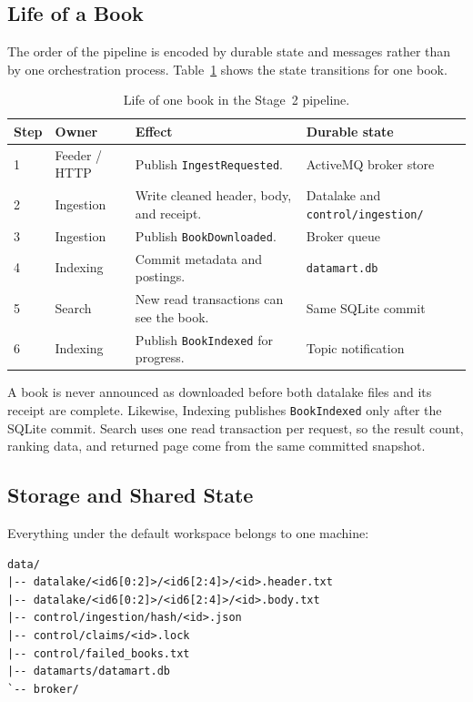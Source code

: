 \documentclass[12pt,a4paper]{article}
\begin{document}
\subsection{Life of a Book}

The order of the pipeline is encoded by durable state and messages rather than by one orchestration
process. Table~\ref{tab:book-life} shows the state transitions for one book.

\begin{table}[H]
    \centering
    \caption{Life of one book in the Stage~2 pipeline.}
    \label{tab:book-life}
    \small
    \begin{tabularx}{\textwidth}{p{} p{} X p{}}
        \toprule
        \textbf{Step} & \textbf{Owner} & \textbf{Effect} & \textbf{Durable state} \\
        \midrule
        1 & Feeder / HTTP & Publish \texttt{IngestRequested}. & ActiveMQ broker store \\
        2 & Ingestion & Write cleaned header, body, and receipt. & Datalake and \texttt{control/ingestion/} \\
        3 & Ingestion & Publish \texttt{BookDownloaded}. & Broker queue \\
        4 & Indexing & Commit metadata and postings. & \texttt{datamart.db} \\
        5 & Search & New read transactions can see the book. & Same SQLite commit \\
        6 & Indexing & Publish \texttt{BookIndexed} for progress. & Topic notification \\
        \bottomrule
    \end{tabularx}
\end{table}

A book is never announced as downloaded before both datalake files and its receipt are complete.
Likewise, Indexing publishes \texttt{BookIndexed} only after the SQLite commit. Search uses one
read transaction per request, so the result count, ranking data, and returned page come from the
same committed snapshot.

\subsection{Storage and Shared State}

Everything under the default workspace belongs to one machine:

\begin{verbatim}
data/
|-- datalake/<id6[0:2]>/<id6[2:4]>/<id>.header.txt
|-- datalake/<id6[0:2]>/<id6[2:4]>/<id>.body.txt
|-- control/ingestion/hash/<id>.json
|-- control/claims/<id>.lock
|-- control/failed_books.txt
|-- datamarts/datamart.db
`-- broker/
\end{verbatim}
\end{document}
